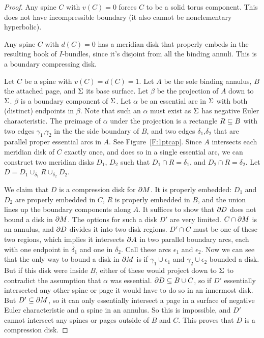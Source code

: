 \begin{proof}

Any spine $C$ with $v(C)=0$ forces $C$ to be a solid torus component. This does
not have incompressible boundary (it also cannot be nonelementary hyperbolic).

Any spine $C$ with $d(C)=0$ has a meridian disk that properly embeds in the
resulting book of $I$-bundles, since it's disjoint from all the binding annuli.
This is a boundary compressing disk.


Let $C$ be a spine with $v(C)=d(C)=1$. Let $A$ be the sole binding annulus, $B$
the attached page, and $\Sigma$ its base surface. Let $\beta$ be the projection of
$A$ down to $\Sigma$. $\beta$ is a boundary component of $\Sigma$. Let $\alpha$ be an
essential arc in $\Sigma$ with both (distinct) endpoints in $\beta$. Note that
such an $\alpha$ must exist as $\Sigma$ has negative Euler characteristic. The
preimage of $\alpha$ under the projection is a rectangle $R \subseteq B$ with two
edges $\gamma_1$,$\gamma_2$ in the the side boundary of $B$, and two edges
$\delta_1$,$\delta_2$ that are parallel proper essential arcs in $A$. See
Figure~\ref{F:1ptcap}. Since $A$ intersects each meridian disk of $C$ exactly
once, and does so in a single essential arc, we can construct two meridian
disks $D_1$, $D_2$ such that $D_1 \cap R = \delta_1$, and $D_2 \cap
R = \delta_2$.  Let $D = D_1 \cup_{\delta_1} R \cup_{\delta_2} D_2$.

We claim that $D$ is a compression disk for $\partial M$. It is properly embedded:
$D_1$ and $D_2$ are properly embedded in $C$, $R$ is properly embedded in $B$,
and the union lines up the boundary components along $A$. It suffices to show
that $\partial D$ does not bound a disk in $\partial M$. The options for such a disk $D'$
are very limited.  $C \cap \partial M$ is an annulus, and $\partial D$ divides it into
two disk regions. $D' \cap C$ must be one of these two regions, which implies
it intersects $\partial A$ in two parallel boundary arcs, each with one endpoint in
$\delta_1$ and one in $\delta_2$.  Call these arcs $\epsilon_1$ and
$\epsilon_2$.  Now we can see that the only way to bound a disk in $\partial M$ is
if $\gamma_1 \cup \epsilon_1$ and $\gamma_2 \cup \epsilon_2$ bounded a disk.
But if this disk were inside $B$, either of these would project down to $\Sigma$
to contradict the assumption that $\alpha$ was essential. $\partial D \subseteq B \cup
C$, so if $D'$ essentially intersected any other spine or page it would have to
do so in an innermost disk. But $D' \subseteq \partial M$, so it can only essentially
intersect a page in a surface of negative Euler characteristic and a spine in
an annulus. So this is impossible, and $D'$ cannot intersect any spines or
pages outside of $B$ and $C$. This proves that $D$ is a compression disk.


\end{proof}
